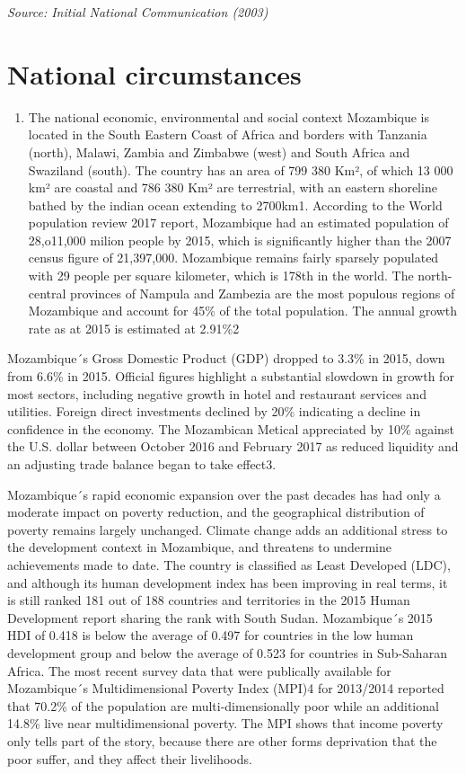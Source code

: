 \documentclass[
]{book}
\providecommand{\tightlist}{%
  \setlength{\itemsep}{0pt}\setlength{\parskip}{0pt}}
\begin{document}
\emph{Source: Initial National Communication (2003)}

\hypertarget{national-circumstances}{%
\chapter{National circumstances}\label{national-circumstances}}

\begin{enumerate}
\def\labelenumi{\alph{enumi}.}
\tightlist
\item
  The national economic, environmental and social context
  Mozambique is located in the South Eastern Coast of Africa and borders with Tanzania (north), Malawi, Zambia and Zimbabwe (west) and South Africa and Swaziland (south). The country has an area of 799 380 Km², of which 13 000 km² are coastal and 786 380 Km² are terrestrial, with an eastern shoreline bathed by the indian ocean extending to 2700km1. According to the World population review 2017 report, Mozambique had an estimated population of 28,o11,000 milion people by 2015, which is significantly higher than the 2007 census figure of 21,397,000. Mozambique remains fairly sparsely populated with 29 people per square kilometer, which is 178th in the world. The north-central provinces of Nampula and Zambezia are the most populous regions of Mozambique and account for 45\% of the total population. The annual growth rate as at 2015 is estimated at 2.91\%2
\end{enumerate}

Mozambique´s Gross Domestic Product (GDP) dropped to 3.3\% in 2015, down from 6.6\% in 2015. Official figures highlight a substantial slowdown in growth for most sectors, including negative growth in hotel and restaurant services and utilities. Foreign direct investments declined by 20\% indicating a decline in confidence in the economy. The Mozambican Metical appreciated by 10\% against the U.S. dollar between October 2016 and February 2017 as reduced liquidity and an adjusting trade balance began to take effect3.

Mozambique´s rapid economic expansion over the past decades has had only a moderate impact on poverty reduction, and the geographical distribution of poverty remains largely unchanged. Climate change adds an additional stress to the development context in Mozambique, and threatens to undermine achievements made to date. The country is classified as Least Developed (LDC), and although its human development index has been improving in real terms, it is still ranked 181 out of 188 countries and territories in the 2015 Human Development report sharing the rank with South Sudan. Mozambique´s 2015 HDI of 0.418 is below the average of 0.497 for countries in the low human development group and below the average of 0.523 for countries in Sub-Saharan Africa. The most recent survey data that were publically available for Mozambique´s Multidimensional Poverty Index (MPI)4 for 2013/2014 reported that 70.2\% of the population are multi-dimensionally poor while an additional 14.8\% live near multidimensional poverty. The MPI shows that income poverty only tells part of the story, because there are other forms deprivation that the poor suffer, and they affect their livelihoods.
\end{document}

